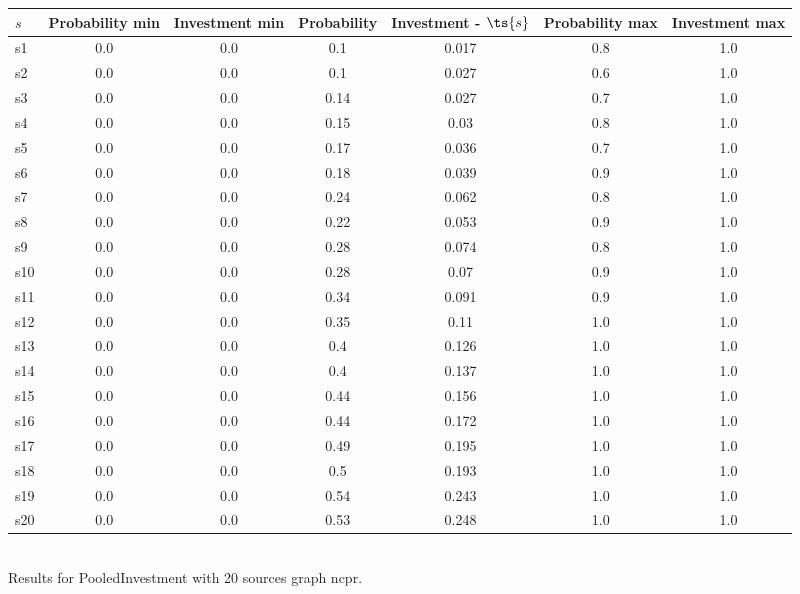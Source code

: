 \documentclass{article}
\begin{document}
\noindent\begin{tabular}{|l|c|c|c|c|c|c|}
\hline
$s$& Probability min & Investment min & Probability & Investment - $\ts{s}$ & Probability max & Investment max\\
\hline
s1 &0.0 & 0.0 & 0.1 & 0.017 & 0.8 & 1.0\\
\hline
s2 &0.0 & 0.0 & 0.1 & 0.027 & 0.6 & 1.0\\
\hline
s3 &0.0 & 0.0 & 0.14 & 0.027 & 0.7 & 1.0\\
\hline
s4 &0.0 & 0.0 & 0.15 & 0.03 & 0.8 & 1.0\\
\hline
s5 &0.0 & 0.0 & 0.17 & 0.036 & 0.7 & 1.0\\
\hline
s6 &0.0 & 0.0 & 0.18 & 0.039 & 0.9 & 1.0\\
\hline
s7 &0.0 & 0.0 & 0.24 & 0.062 & 0.8 & 1.0\\
\hline
s8 &0.0 & 0.0 & 0.22 & 0.053 & 0.9 & 1.0\\
\hline
s9 &0.0 & 0.0 & 0.28 & 0.074 & 0.8 & 1.0\\
\hline
s10 &0.0 & 0.0 & 0.28 & 0.07 & 0.9 & 1.0\\
\hline
s11 &0.0 & 0.0 & 0.34 & 0.091 & 0.9 & 1.0\\
\hline
s12 &0.0 & 0.0 & 0.35 & 0.11 & 1.0 & 1.0\\
\hline
s13 &0.0 & 0.0 & 0.4 & 0.126 & 1.0 & 1.0\\
\hline
s14 &0.0 & 0.0 & 0.4 & 0.137 & 1.0 & 1.0\\
\hline
s15 &0.0 & 0.0 & 0.44 & 0.156 & 1.0 & 1.0\\
\hline
s16 &0.0 & 0.0 & 0.44 & 0.172 & 1.0 & 1.0\\
\hline
s17 &0.0 & 0.0 & 0.49 & 0.195 & 1.0 & 1.0\\
\hline
s18 &0.0 & 0.0 & 0.5 & 0.193 & 1.0 & 1.0\\
\hline
s19 &0.0 & 0.0 & 0.54 & 0.243 & 1.0 & 1.0\\
\hline
s20 &0.0 & 0.0 & 0.53 & 0.248 & 1.0 & 1.0\\
\hline
\end{tabular}\\

\noindent Results for PooledInvestment with 20 sources graph ncpr.
\end{document}
